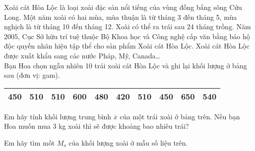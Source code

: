 \begin{bt}%
Xoài cát Hòa Lộc là loại xoài đặc sản nổi tiếng của vùng đồng bẳng sông Cửu Long. Một năm xoài có hai mùa, mùa thuận là từ tháng 3 đến tháng 5, mùa nghịch là từ tháng 10 đến tháng 12. Xoài có thể ra trái sau 24 tháng trồng. Năm 2005, Cục Sở hữu trí tuệ thuộc Bộ Khoa học và Công nghệ cấp văn bằng bảo hộ độc quyền nhãn hiệu tập thể cho sản phẩm Xoài cát Hòa Lộc. Xoài cát Hòa Lộc được xuất khẩu sang các nước Pháp, Mỹ, Canada\ldots\\
Bạn Hoa chọn ngẫu nhiên 10 trái xoài cát Hòa Lộc và ghi lại khối lượng ở bảng sau (đơn vị: gam).
\begin{center}
\begin{tabular}{|l|l|l|l|l|l|l|l|l|l|}
\hline 450 & 510 & 510 & 600 & 480 & 420 & 510 & 450 & 650 & 540 \\
\hline
\end{tabular}
\end{center}
\begin{listEX}
\item Em hãy tính khối lượng trung bình $\overline{x}$ của một trái xoài ở bảng trên. Nếu bạn Hoa muốn mua $3 $ kg xoài thì sẽ được khoảng bao nhiêu trái?
\item Em hãy tìm mốt $M_o$ của khối lượng xoài ở mẫu số liệu trên.
\end{listEX}
\end{bt}
